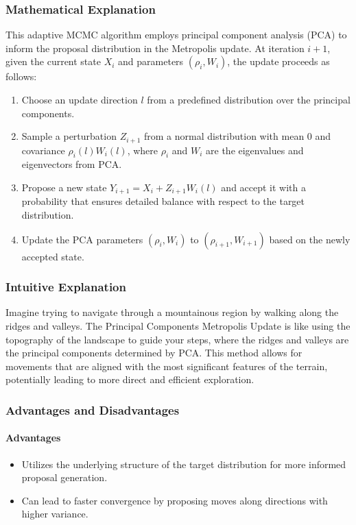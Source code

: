 \documentclass{article}
\begin{document}
\subsubsection{Mathematical Explanation}
This adaptive MCMC algorithm employs principal component analysis (PCA) to inform the proposal distribution in the Metropolis update. At iteration \(i + 1\), given the current state \(X_i\) and parameters \((\rho_i, W_i)\), the update proceeds as follows:
\begin{enumerate}
    \item Choose an update direction \(l\) from a predefined distribution over the principal components.
    \item Sample a perturbation \(Z_{i+1}\) from a normal distribution with mean \(0\) and covariance \(\rho_i(l) W_i(l)\), where \(\rho_i\) and \(W_i\) are the eigenvalues and eigenvectors from PCA.
    \item Propose a new state \(Y_{i+1} = X_i + Z_{i+1} W_i(l)\) and accept it with a probability that ensures detailed balance with respect to the target distribution.
    \item Update the PCA parameters \((\rho_i, W_i)\) to \((\rho_{i+1}, W_{i+1})\) based on the newly accepted state.
\end{enumerate}

\subsubsection{Intuitive Explanation}
Imagine trying to navigate through a mountainous region by walking along the ridges and valleys. The Principal Components Metropolis Update is like using the topography of the landscape to guide your steps, where the ridges and valleys are the principal components determined by PCA. This method allows for movements that are aligned with the most significant features of the terrain, potentially leading to more direct and efficient exploration.
\subsubsection{Advantages and Disadvantages}
\paragraph{Advantages}
\begin{itemize}
    \item Utilizes the underlying structure of the target distribution for more informed proposal generation.
    \item Can lead to faster convergence by proposing moves along directions with higher variance.
\end{itemize}
\end{document}
